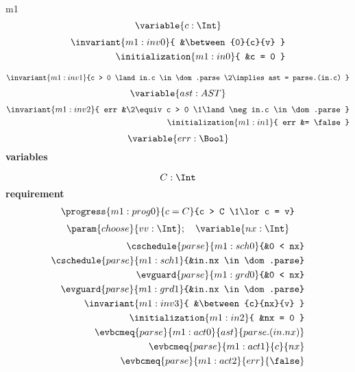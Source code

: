 \documentclass[12pt]{amsart}
\begin{document}
    \begin{machine}{m1}
    \[ \variable{c : \Int} \]
    \begin{align}
        \invariant{m1:inv0}{ &\between{0}{c}{v} } \\
        \initialization{m1:in0}{ &c = 0 } 
    \end{align}
    \begin{itemize}
    \end{itemize}
    \begin{align}
        \invariant{m1:inv1}{c > 0 \land in.c \in \dom.parse 
            \2\implies ast = parse.(in.c) }
    \end{align}
    \[ \variable{ast : AST} \]
    \begin{align}
        \invariant{m1:inv2}{ err &\2\equiv c > 0 
            \1\land \neg in.c \in \dom.parse } \\
        \initialization{m1:in1}{ err &= \false }
    \end{align}
    \[ \variable{ err : \Bool } \]
\noindent \textbf{variables}
\begin{itemize}
\end{itemize}
\[ \dummy{C : \Int} \]
\noindent \textbf{requirement}
\begin{align}
    \progress{m1:prog0}{c = C}{c > C \1\lor c = v}
\end{align}
\[ \param{choose}{vv : \Int} ; \quad \variable{ nx : \Int } \]
\begin{align}
    \cschedule{parse}{m1:sch0}{&0 < nx} \\
    \cschedule{parse}{m1:sch1}{&in.nx \in \dom.parse} \\
    \evguard{parse}{m1:grd0}{&0 < nx} \\
    \evguard{parse}{m1:grd1}{&in.nx \in \dom.parse} \\
    \invariant{m1:inv3}{ &\between{c}{nx}{v} } \\
    \initialization{m1:in2}{ &nx = 0 } \\
    \evbcmeq{parse}{m1:act0}{ast}{ parse.(in.nx) } \\
    \evbcmeq{parse}{m1:act1}{c}{nx} \\
    \evbcmeq{parse}{m1:act2}{err}{\false}
\end{align}
\begin{align*}

\end{align*}
\end{machine}
\end{document}
